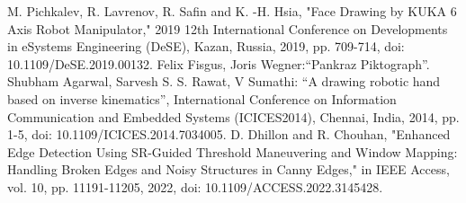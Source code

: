 \newlength{\oldbaselineskip}
\begin{thebibliography}{99}
	M. Pichkalev, R. Lavrenov, R. Safin and K. -H. Hsia, "Face Drawing by KUKA 6 Axis Robot Manipulator," 2019 12th International Conference on Developments in eSystems Engineering (DeSE), Kazan, Russia, 2019, pp. 709-714, doi: 10.1109/DeSE.2019.00132.
	 Felix Fisgus, Joris Wegner:``Pankraz Piktograph''.
	 Shubham Agarwal, Sarvesh S. S. Rawat, V Sumathi: ``A drawing robotic hand based on inverse kinematics'', International Conference on Information Communication and Embedded Systems (ICICES2014), Chennai, India, 2014, pp. 1-5, doi: 10.1109/ICICES.2014.7034005.
	D. Dhillon and R. Chouhan, "Enhanced Edge Detection Using SR-Guided Threshold Maneuvering and Window Mapping: Handling Broken Edges and Noisy Structures in Canny Edges," in IEEE Access, vol. 10, pp. 11191-11205, 2022, doi: 10.1109/ACCESS.2022.3145428.
\end{thebibliography}
